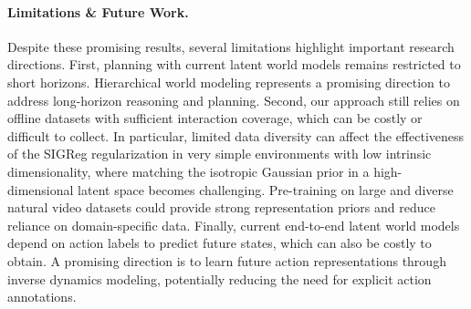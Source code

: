 \documentclass{article}
\begin{document}
\paragraph{Limitations \& Future Work.} Despite these promising results, several limitations highlight important research directions. First, planning with current latent world models remains restricted to short horizons. Hierarchical world modeling represents a promising direction to address long-horizon reasoning and planning. Second, our approach still relies on offline datasets with sufficient interaction coverage, which can be costly or difficult to collect. In particular, limited data diversity can affect the effectiveness of the SIGReg regularization in very simple environments with low intrinsic dimensionality, where matching the isotropic Gaussian prior in a high-dimensional latent space becomes challenging. Pre-training on large and diverse natural video datasets could provide strong representation priors and reduce reliance on domain-specific data. Finally, current end-to-end latent world models depend on action labels to predict future states, which can also be costly to obtain. A promising direction is to learn future action representations through inverse dynamics modeling, potentially reducing the need for explicit action annotations.





\appendix



\end{document}
